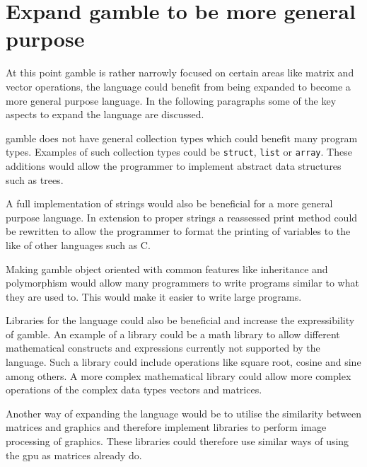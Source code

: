 \section{Expand \gls{gamble} to be more general purpose}
At this point \gls{gamble} is rather narrowly focused on certain areas like matrix and vector operations, the language could benefit from being expanded to become a more general purpose language.
In the following paragraphs some of the key aspects to expand the language are discussed.

\gls{gamble} does not have general collection types which could benefit many program types.
Examples of such collection types could be \texttt{struct}, \texttt{list} or \texttt{array}.
These additions would allow the programmer to implement abstract data structures such as trees.

A full implementation of strings would also be beneficial for a more general purpose language.
In extension to proper strings a reassessed print method could be rewritten to allow the programmer to format the printing of variables to the like of other languages such as C.

Making \gls{gamble} object oriented with common features like inheritance and polymorphism would allow many programmers to write programs similar to what they are used to.
This would make it easier to write large programs.

Libraries for the language could also be beneficial and increase the expressibility of \gls{gamble}.
An example of a library could be a math library to allow different mathematical constructs and expressions currently not supported by the language.
Such a library could include operations like square root, cosine and sine among others.
A more complex mathematical library could allow more complex operations of the complex data types vectors and matrices.

Another way of expanding the language would be to utilise the similarity between matrices and graphics and therefore implement libraries to perform image processing of graphics.
These libraries could therefore use similar ways of using the \acrshort{gpu} as matrices already do.